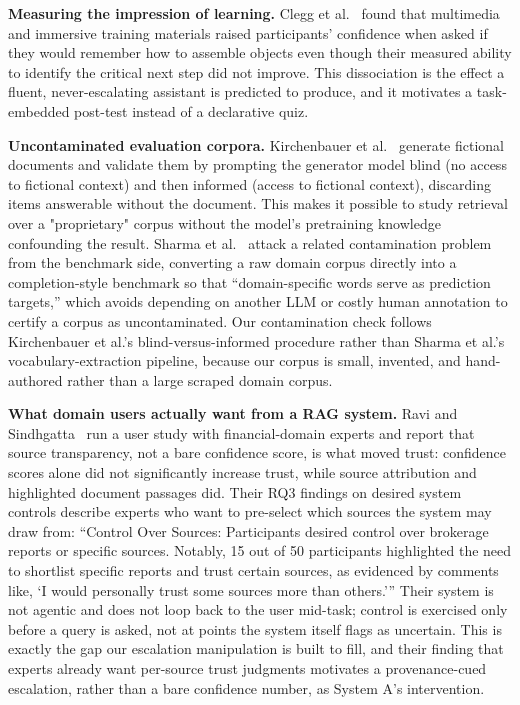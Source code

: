 \documentclass[sigconf,nonacm]{acmart}
\begin{document}
\textbf{Measuring the impression of learning.} Clegg
et al.~\cite{clegg2022} found that multimedia and immersive training materials raised participants' confidence when asked if they would remember how to assemble objects even though their measured ability to identify the critical next step did not improve. This dissociation is the effect a fluent, never-escalating assistant is predicted to produce, and it motivates a task-embedded post-test instead of a declarative quiz.

\textbf{Uncontaminated evaluation corpora.} Kirchenbauer
et al.~\cite{kirchenbauer2026} generate fictional documents and validate
them by prompting the generator model blind (no access to fictional context) and then informed (access to fictional context), discarding items answerable without the document. This makes it possible to study retrieval over a "proprietary" corpus without the model's pretraining
knowledge confounding the result. Sharma et al.~\cite{sharma2026} attack a
related contamination problem from the benchmark side, converting a raw
domain corpus directly into a completion-style benchmark so that
``domain-specific words serve as prediction targets,'' which avoids
depending on another LLM or costly human annotation to certify a corpus as
uncontaminated. Our contamination check follows Kirchenbauer et al.'s
blind-versus-informed procedure rather than Sharma et al.'s vocabulary-extraction pipeline, because our corpus is small, invented, and hand-authored rather than a large scraped domain corpus.

\textbf{What domain users actually want from a RAG system.} Ravi and
Sindhgatta~\cite{ravi2025} run a user study with financial-domain experts
and report that source transparency, not a bare confidence score, is what
moved trust: confidence scores alone did not significantly increase trust, while source attribution and highlighted document passages did. Their RQ3
findings on desired system controls describe experts who want to
pre-select which sources the system may draw from: ``Control Over
Sources: Participants desired control over brokerage reports or specific
sources. Notably, 15 out of 50 participants highlighted the need to
shortlist specific reports and trust certain sources, as evidenced by
comments like, `I would personally trust some sources more than others.'''
Their system is not agentic and does not loop back to the user mid-task;
control is exercised only before a query is asked, not at points the
system itself flags as uncertain. This is exactly the gap our escalation
manipulation is built to fill, and their finding that experts already want
per-source trust judgments motivates a provenance-cued escalation, rather
than a bare confidence number, as System A's intervention.
\end{document}
